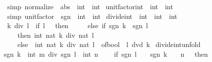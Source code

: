\begin{isabellebody}
\ \ \ {\isacharbrackleft}{\kern0pt}simp{\isacharbrackright}{\kern0pt}{\isacharcolon}{\kern0pt}\ {\isachardoublequoteopen}normalize\ {\isacharequal}{\kern0pt}\ {\isacharparenleft}{\kern0pt}abs\ {\isacharcolon}{\kern0pt}{\isacharcolon}{\kern0pt}\ int\ {\isasymRightarrow}\ int{\isacharparenright}{\kern0pt}{\isachardoublequoteclose}\isanewline
\isanewline
{}\isamarkupfalse%
\ unit{\isacharunderscore}{\kern0pt}factor{\isacharunderscore}{\kern0pt}int\ {\isacharcolon}{\kern0pt}{\isacharcolon}{\kern0pt}\ {\isachardoublequoteopen}int\ {\isasymRightarrow}\ int{\isachardoublequoteclose}\isanewline
\ \ \ {\isacharbrackleft}{\kern0pt}simp{\isacharbrackright}{\kern0pt}{\isacharcolon}{\kern0pt}\ {\isachardoublequoteopen}unit{\isacharunderscore}{\kern0pt}factor\ {\isacharequal}{\kern0pt}\ {\isacharparenleft}{\kern0pt}sgn\ {\isacharcolon}{\kern0pt}{\isacharcolon}{\kern0pt}\ int\ {\isasymRightarrow}\ int{\isacharparenright}{\kern0pt}{\isachardoublequoteclose}\isanewline
\isanewline
{}\isamarkupfalse%
\ divide{\isacharunderscore}{\kern0pt}int\ {\isacharcolon}{\kern0pt}{\isacharcolon}{\kern0pt}\ {\isachardoublequoteopen}int\ {\isasymRightarrow}\ int\ {\isasymRightarrow}\ int{\isachardoublequoteclose}\isanewline
\ \ \ {\isachardoublequoteopen}k\ div\ l\ {\isacharequal}{\kern0pt}\ {\isacharparenleft}{\kern0pt}if\ l\ {\isacharequal}{\kern0pt}\ {}\ then\ {}\isanewline
\ \ \ \ else\ if\ sgn\ k\ {\isacharequal}{\kern0pt}\ sgn\ l\isanewline
\ \ \ \ \ \ then\ int\ {\isacharparenleft}{\kern0pt}nat\ {\isasymbar}k{\isasymbar}\ div\ nat\ {\isasymbar}l{\isasymbar}{\isacharparenright}{\kern0pt}\isanewline
\ \ \ \ \ \ else\ {\isacharminus}{\kern0pt}\ int\ {\isacharparenleft}{\kern0pt}nat\ {\isasymbar}k{\isasymbar}\ div\ nat\ {\isasymbar}l{\isasymbar}\ {\isacharplus}{\kern0pt}\ of{\isacharunderscore}{\kern0pt}bool\ {\isacharparenleft}{\kern0pt}{\isasymnot}\ l\ dvd\ k{\isacharparenright}{\kern0pt}{\isacharparenright}{\kern0pt}{\isacharparenright}{\kern0pt}{\isachardoublequoteclose}\isanewline
\isanewline
{}\isamarkupfalse%
\ divide{\isacharunderscore}{\kern0pt}int{\isacharunderscore}{\kern0pt}unfold{\isacharcolon}{\kern0pt}\isanewline
\ \ {\isachardoublequoteopen}{\isacharparenleft}{\kern0pt}sgn\ k\ {\isacharasterisk}{\kern0pt}\ int\ m{\isacharparenright}{\kern0pt}\ div\ {\isacharparenleft}{\kern0pt}sgn\ l\ {\isacharasterisk}{\kern0pt}\ int\ n{\isacharparenright}{\kern0pt}\ {\isacharequal}{\kern0pt}\isanewline
\ \ \ {\isacharparenleft}{\kern0pt}if\ sgn\ l\ {\isacharequal}{\kern0pt}\ {}\ {\isasymor}\ sgn\ k\ {\isacharequal}{\kern0pt}\ {}\ {\isasymor}\ n\ {\isacharequal}{\kern0pt}\ {}\ then\ {}\isanewline

\end{isabellebody}
